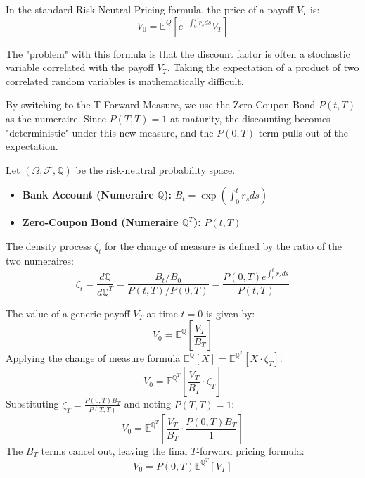\documentclass[12pt,a4paper]{exam}
\begin{document}
\begin{questions}
\begin{solution}
	In the standard Risk-Neutral Pricing formula, the price of a payoff $V_T$ is:
	\begin{equation*}
		V_0=\mathbb{E}^Q\left[e^{-\int_0^T r_s ds} V_T\right]
	\end{equation*}

	The "problem" with this formula is that the discount factor is often a stochastic variable correlated with the payoff $V_T$. Taking the expectation of a product of two correlated random variables is mathematically difficult.

	By switching to the T-Forward Measure, we use the Zero-Coupon Bond $P(t,T)$ as the numeraire. Since $P(T,T)=1$ at maturity, the discounting becomes "deterministic" under this new measure, and the $P(0,T)$ term pulls out of the expectation.

	Let $(\Omega, \mathcal{F}, \mathbb{Q})$ be the risk-neutral probability space.
	\begin{itemize}
		\item \textbf{Bank Account (Numeraire $\mathbb{Q}$):} $B_t = \exp\left( \int_0^t r_s ds \right)$
		\item \textbf{Zero-Coupon Bond (Numeraire $\mathbb{Q}^T$):} $P(t, T)$
	\end{itemize}

	The density process $\zeta_t$ for the change of measure is defined by the ratio of the two numeraires:
	\begin{equation*}
		\zeta_t = \frac{d\mathbb{Q}}{d\mathbb{Q}^T} = \frac{B_t / B_0}{P(t, T) / P(0, T)} = \frac{P(0, T) e^{\int_0^t r_s ds}}{P(t, T)}
	\end{equation*}

	The value of a generic payoff $V_T$ at time $t=0$ is given by:
	\begin{equation*}
		V_0 = \mathbb{E}^\mathbb{Q} \left[ \frac{V_T}{B_T} \right]
	\end{equation*}
	Applying the change of measure formula $\mathbb{E}^\mathbb{Q}[X] = \mathbb{E}^{\mathbb{Q}^T}[X \cdot \zeta_T]$:
	\begin{equation*}
		V_0 = \mathbb{E}^{\mathbb{Q}^T} \left[ \frac{V_T}{B_T} \cdot \zeta_T \right]
	\end{equation*}
	Substituting $\zeta_T = \frac{P(0, T) B_T}{P(T, T)}$ and noting $P(T, T) = 1$:
	\begin{equation*}
		V_0 = \mathbb{E}^{\mathbb{Q}^T} \left[ \frac{V_T}{B_T} \cdot \frac{P(0, T) B_T}{1} \right]
	\end{equation*}
	The $B_T$ terms cancel out, leaving the final $T$-forward pricing formula:
	\begin{equation*}
		V_0 = P(0, T) \mathbb{E}^{\mathbb{Q}^T} [ V_T ]
	\end{equation*}


\end{solution}
\end{questions}
\end{document}
